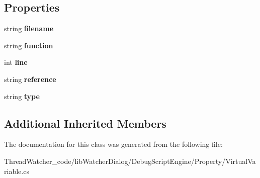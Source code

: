 \subsection*{Properties}
\begin{DoxyCompactItemize}
\item 
\hypertarget{classlib_watcher_dialog_1_1_debug_script_engine_1_1_property_1_1_variable_info_a39ae4ae2a7f47cee70025e839a252a2e}{string {\bfseries filename}}\label{classlib_watcher_dialog_1_1_debug_script_engine_1_1_property_1_1_variable_info_a39ae4ae2a7f47cee70025e839a252a2e}

\item 
\hypertarget{classlib_watcher_dialog_1_1_debug_script_engine_1_1_property_1_1_variable_info_a8e18948c9c0c5d85cca78360099b2f5b}{string {\bfseries function}}\label{classlib_watcher_dialog_1_1_debug_script_engine_1_1_property_1_1_variable_info_a8e18948c9c0c5d85cca78360099b2f5b}

\item 
\hypertarget{classlib_watcher_dialog_1_1_debug_script_engine_1_1_property_1_1_variable_info_afad4b851aaa3e15d346f7bdad1d3c234}{int {\bfseries line}}\label{classlib_watcher_dialog_1_1_debug_script_engine_1_1_property_1_1_variable_info_afad4b851aaa3e15d346f7bdad1d3c234}

\item 
\hypertarget{classlib_watcher_dialog_1_1_debug_script_engine_1_1_property_1_1_variable_info_a5129b6fd8a72466fa877a9aace285570}{string {\bfseries reference}}\label{classlib_watcher_dialog_1_1_debug_script_engine_1_1_property_1_1_variable_info_a5129b6fd8a72466fa877a9aace285570}

\item 
\hypertarget{classlib_watcher_dialog_1_1_debug_script_engine_1_1_property_1_1_variable_info_a98cbfe36743ca6074904a1e5c141c577}{string {\bfseries type}}\label{classlib_watcher_dialog_1_1_debug_script_engine_1_1_property_1_1_variable_info_a98cbfe36743ca6074904a1e5c141c577}

\end{DoxyCompactItemize}
\subsection*{Additional Inherited Members}


The documentation for this class was generated from the following file\+:\begin{DoxyCompactItemize}
\item 
Thread\+Watcher\+\_\+code/lib\+Watcher\+Dialog/\+Debug\+Script\+Engine/\+Property/Virtual\+Variable.\+cs\end{DoxyCompactItemize}

